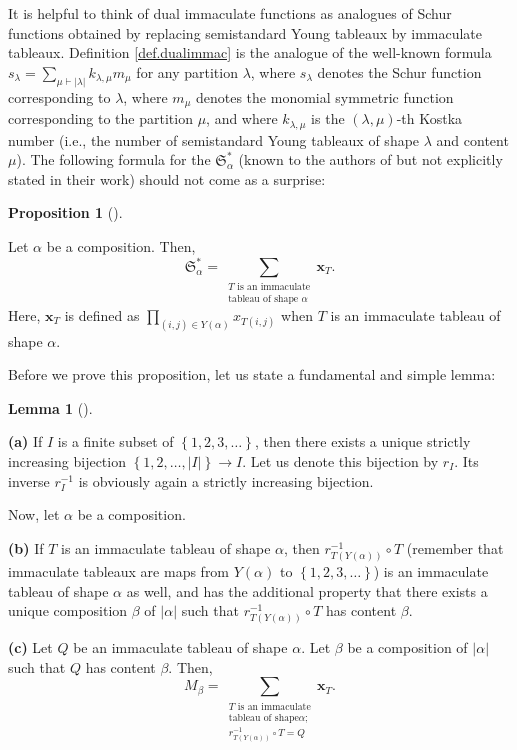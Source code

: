 \documentclass[numbers=enddot,12pt,final,onecolumn,notitlepage,abstracton]{scrartcl}%
\theoremstyle{definition}
\newtheorem{lem}[theo]{Lemma}
\newenvironment{lemma}[1][]
{\begin{lem}[#1]\begin{leftbar}}
{\end{leftbar}\end{lem}}
\newtheorem{prop}[theo]{Proposition}
\newenvironment{proposition}[1][]
{\begin{prop}[#1]\begin{leftbar}}
{\end{leftbar}\end{prop}}
\let\sumnonlimits\sum
\let\prodnonlimits\prod
\renewcommand{\sum}{\sumnonlimits\limits}
\renewcommand{\prod}{\prodnonlimits\limits}
\begin{document}
It is helpful to think of dual immaculate functions as analogues of Schur
functions obtained by replacing semistandard Young tableaux by immaculate
tableaux. Definition \ref{def.dualimmac} is the analogue of the well-known
formula $s_{\lambda}=\sum_{\mu\vdash\left\vert \lambda\right\vert }%
k_{\lambda,\mu}m_{\mu}$ for any partition $\lambda$, where $s_{\lambda}$
denotes the Schur function corresponding to $\lambda$, where $m_{\mu}$ denotes
the monomial symmetric function corresponding to the partition $\mu$, and
where $k_{\lambda,\mu}$ is the $\left(  \lambda,\mu\right)  $-th Kostka number
(i.e., the number of semistandard Young tableaux of shape $\lambda$ and
content $\mu$). The following formula for the $\mathfrak{S}_{\alpha}^{\ast}$
(known to the authors of \cite{BBSSZ} but not explicitly stated in their work)
should not come as a surprise:

\begin{proposition}
\label{prop.dualImm}Let $\alpha$ be a composition. Then,%
\[
\mathfrak{S}_{\alpha}^{\ast}=\sum_{\substack{T\text{ is an immaculate}%
\\\text{tableau of shape }\alpha}}\mathbf{x}_{T}.
\]
Here, $\mathbf{x}_{T}$ is defined as $\prod_{\left(  i,j\right)  \in Y\left(
\alpha\right)  }x_{T\left(  i,j\right)  }$ when $T$ is an immaculate tableau
of shape $\alpha$.
\end{proposition}

Before we prove this proposition, let us state a fundamental and simple lemma:

\begin{lemma}
\label{lem.dualImm.trivia}\textbf{(a)} If $I$ is a finite subset of $\left\{
1,2,3,\ldots\right\}  $, then there exists a unique strictly increasing
bijection $\left\{  1,2,\ldots,\left\vert I\right\vert \right\}  \rightarrow
I$. Let us denote this bijection by $r_{I}$. Its inverse $r_{I}^{-1}$ is
obviously again a strictly increasing bijection.

Now, let $\alpha$ be a composition.

\textbf{(b)} If $T$ is an immaculate tableau of shape $\alpha$, then
$r_{T\left(  Y\left(  \alpha\right)  \right)  }^{-1}\circ T$ (remember that
immaculate tableaux are maps from $Y\left(  \alpha\right)  $ to $\left\{
1,2,3,\ldots\right\}  $) is an immaculate tableau of shape $\alpha$ as well,
and has the additional property that there exists a unique composition $\beta$
of $\left\vert \alpha\right\vert $ such that $r_{T\left(  Y\left(
\alpha\right)  \right)  }^{-1}\circ T$ has content $\beta$.

\textbf{(c)} Let $Q$ be an immaculate tableau of shape $\alpha$. Let $\beta$
be a composition of $\left\vert \alpha\right\vert $ such that $Q$ has content
$\beta$. Then,%
\begin{equation}
M_{\beta}=\sum_{\substack{T\text{ is an immaculate}\\\text{tableau of shape
}\alpha;\\r_{T\left(  Y\left(  \alpha\right)  \right)  }^{-1}\circ
T=Q}}\mathbf{x}_{T}. \label{pf.dualImm.M}%
\end{equation}

\end{lemma}
\end{document}
